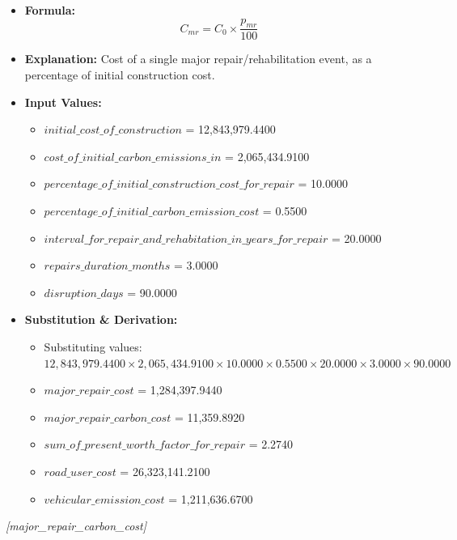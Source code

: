 \documentclass[12pt,a4paper]{article}
\begin{document}
\begin{itemize}
  \item \textbf{Formula:} $$C_{mr} = C_0 \times \frac{p_{mr}}{100}$$
  \item \textbf{Explanation:} Cost of a single major repair/rehabilitation event, as a percentage of initial construction cost.
  \item \textbf{Input Values:}
  \begin{itemize}
    \item $initial\_cost\_of\_construction$ = 12,843,979.4400
    \item $cost\_of\_initial\_carbon\_emissions\_in$ = 2,065,434.9100
    \item $percentage\_of\_initial\_construction\_cost\_for\_repair$ = 10.0000
    \item $percentage\_of\_initial\_carbon\_emission\_cost$ = 0.5500
    \item $interval\_for\_repair\_and\_rehabitation\_in\_years\_for\_repair$ = 20.0000
    \item $repairs\_duration\_months$ = 3.0000
    \item $disruption\_days$ = 90.0000
  \end{itemize}
  \item \textbf{Substitution \& Derivation:}
  \begin{itemize}
    \item Substituting values: $12,843,979.4400 \times 2,065,434.9100 \times 10.0000 \times 0.5500 \times 20.0000 \times 3.0000 \times 90.0000$
    \item $major\_repair\_cost$ = 1,284,397.9440
    \item $major\_repair\_carbon\_cost$ = 11,359.8920
    \item $sum\_of\_present\_worth\_factor\_for\_repair$ = 2.2740
    \item $road\_user\_cost$ = 26,323,141.2100
    \item $vehicular\_emission\_cost$ = 1,211,636.6700
  \end{itemize}
\end{itemize}


\textit{[major\_repair\_carbon\_cost]}
\end{document}
